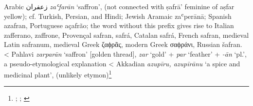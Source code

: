 \begin{etymology}\label{ety:zafaran}
Arabic {زعفران} \textit{zaʿfarān} `saffron', (not connected with ṣafrā' feminine of aṣfar yellow); cf. Turkish, Persian, and Hindi; Jewish Aramaic zaʿperānā; Spanish azafran, Portuguese açafrão; the word without this prefix gives rise to Italian zafferano, zaffrone, Provençal safran, safrá, Catalan safrá, French safran, medieval Latin safranum, medieval Greek ζαϕρᾶς, modern Greek σαϕράνι, Russian šafran. 
< Pahlavi \textit{zarparān} `saffron' [golden thread], \textit{zar} `gold' + \textit{par} `feather' + \textit{-ān} `pl.', a pseudo-etymological explanation
< Akkadian {} \textit{azupīru, azupīrānu} `a spice and medicinal plant', (unlikely etymon)\footnote{\textcite{wehr_dictionary_1976}; \textcites[]{asbaghi_persische_1988}[65, 98]{mackenzie_concise_1986}[safran]{ns}; \textcites[33]{black_concise_2000}[vol. 2, 530-531]{roth_assyrian_2004}}
\end{etymology}